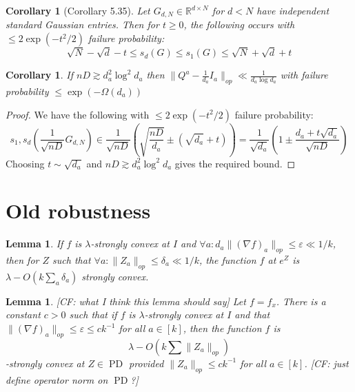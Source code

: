 \documentclass{article}
\newtheorem{corollary}[theorem]{Corollary}
\newtheorem{lemma}[theorem]{Lemma}
\newcommand\samp{x}
\newcommand{\R}{{\mathbb{R}}}
\newcommand\eps{\varepsilon}
\newcommand\PD{\operatorname{PD}}
\newcommand{\CF}[1]{{\color{purple}[CF: #1]}}
\begin{document}

\begin{corollary} [Corollary 5.35]%
Let $G_{d,N} \in \R^{d \times N}$ for $d < N$ have independent standard Gaussian entries. Then for $t \geq 0$, the following occurs with $\leq 2 \exp(-t^{2}/2)$ failure probability:
\[ \sqrt{N} - \sqrt{d} - t \leq s_{d}(G) \leq s_{1}(G) \leq \sqrt{N} + \sqrt{d} + t  \]
\end{corollary}

\begin{corollary}
If $nD \gtrsim d_{a}^{2} \log^{2} d_{a}$ then $\|Q^{a} - \frac{1}{d_{a}} I_{a} \|_{op} \ll \frac{1}{d_{a} \log d_{a}}$ with failure probability $\leq \exp( - \Omega(d_{a}))$
\end{corollary}
\begin{proof}
We have the following with $\leq 2 \exp(-t^{2}/2)$ failure probability:
\[ s_{1},s_{d}\left( \frac{1}{\sqrt{nD}} G_{d,N} \right) \in \frac{1}{\sqrt{nD}} \left( \sqrt{\frac{nD}{d_{a}}} \pm (\sqrt{d_{a}} + t) \right) = \frac{1}{\sqrt{d_{a}}}\left( 1 \pm \frac{d_{a} + t \sqrt{d_{a}}}{\sqrt{nD}}  \right)  \]
Choosing $t \sim \sqrt{d_{a}}$ and $nD \gtrsim d_{a}^{2} \log^{2} d_{a}$ gives the required bound.
\end{proof}


\section{Old robustness}

\begin{lemma}\label{lem:perturbation-old}
If $f$ is $\lambda$-strongly convex at $I$ and $\forall a: d_{a} \|(\nabla f)_{a}\|_{op} \leq \eps \ll 1/k$, then for $Z$ such that $\forall a: \|Z_{a}\|_{op} \leq \delta_{a} \ll 1/k$, the function $f$ at $e^{Z}$ is $\lambda - O(k \sum_{a} \delta_{a})$ strongly convex.
\end{lemma}

\begin{lemma}\label{lem:perturbation} \CF{what I think this lemma should say} Let $f = f_{\samp}$. There is a constant $c > 0$ such that if $f$ is $\lambda$-strongly convex at $I$ and that $\|(\nabla f)_{a}\|_{op} \leq \eps \leq c k ^{-1}$ for all $ a \in [k]$, then the function $f$ is 
$$ \lambda - O(k \sum \|Z_a\|_{op})$$
-strongly convex at $Z \in \PD$ provided $\|Z_a\|_{op} \leq c k^{-1}$ for all $a \in [k]$. \CF{just define operator norm on $\PD$?}

\end{lemma}
\end{document}
